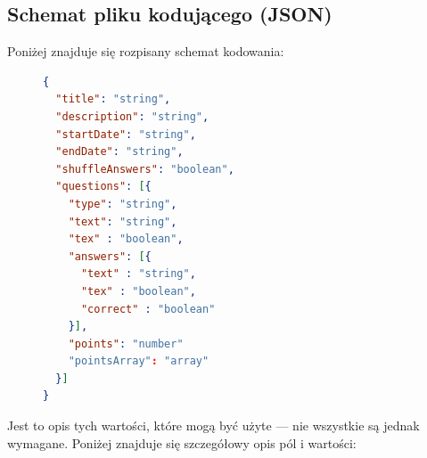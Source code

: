 \subsection{Schemat pliku kodującego (JSON)}
Poniżej znajduje się rozpisany schemat kodowania: 
\begin{figure}[H]
\begin{lstlisting}[language=json,firstnumber=1]
{
  "title": "string",
  "description": "string",
  "startDate": "string",
  "endDate": "string",
  "shuffleAnswers": "boolean",
  "questions": [{
    "type": "string", 
    "text": "string",
    "tex" : "boolean",
    "answers": [{
      "text" : "string",
      "tex" : "boolean",
      "correct" : "boolean"
    }],
    "points": "number"
    "pointsArray": "array"
  }]
}

\end{lstlisting}
\end{figure}
Jest to opis tych wartości, które mogą być użyte --- nie wszystkie są jednak 
wymagane. Poniżej znajduje się szczegółowy opis pól i wartości:
